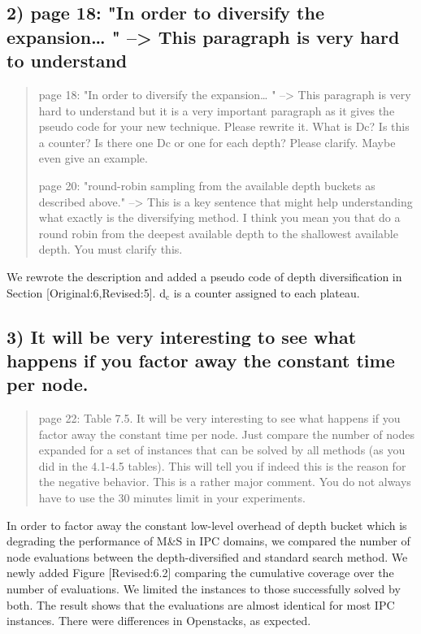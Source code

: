 \documentclass{article}
\begin{document}
\subsection{2) page 18: "In order to diversify the expansion\ldots{} " --> This paragraph is very hard to understand}
\label{sec:orgheadline2}

\begin{quote}
page 18: "In order to diversify the expansion\ldots{} " --> This
paragraph is very hard to understand but it is a very important
paragraph as it gives the pseudo code for your new technique. Please
rewrite it. What is Dc? Is this a counter? Is there one Dc or one for
each depth? Please clarify. Maybe even give an example.

page 20: "round-robin sampling from the available depth buckets as
described above." --> This is a key sentence that might help
understanding what exactly is the diversifying method. I think you
mean you that do a round robin from the deepest available depth to the
shallowest available depth. You must clarify this.
\end{quote}

We rewrote the description and added a pseudo code of depth diversification
in Section [Original:6,Revised:5].
d\(_{\text{c}}\) is a counter assigned to each plateau.

\subsection{3) It will be very interesting to see what happens if you factor away the constant time per node.}
\label{sec:orgheadline3}

\begin{quote}
page 22: Table 7.5. It will be very interesting to see what
happens if you factor away the constant time per node. Just compare
the number of nodes expanded for a set of instances that can be solved
by all methods (as you did in the 4.1-4.5 tables). This will tell you
if indeed this is the reason for the negative behavior. This is a
rather major comment. You do not always have to use the 30 minutes
limit in your experiments.
\end{quote}

In order to factor away the constant low-level overhead of depth bucket
which is degrading the performance of M\&S in IPC domains,
we compared the number of node evaluations between the depth-diversified and standard search method.
We newly added Figure [Revised:6.2] comparing the cumulative coverage over the number of evaluations.
We limited the instances to those successfully solved by both.
The result shows that the evaluations are almost identical for most IPC instances.
There were differences in Openstacks, as expected.
\end{document}
